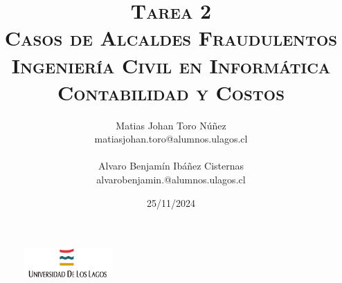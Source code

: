 \documentclass[letter,12pt]{article}
\begin{document}
	\begin{figure}
		\includegraphics[width=0.3\textwidth, left]{figures/download.png}
	\end{figure}
	\setlength{\unitlength}{1 cm} 
	\title{\scshape\Huge{Tarea 2}\\\vspace{0.5cm}
		\Large \textbf{Casos de Alcaldes Fraudulentos}\\\vspace{2cm}
		\Large Ingeniería Civil en Informática\\\vspace{1cm}
		\Large Contabilidad y Costos\\\vspace{2cm}}
	
	\author{
		Matias Johan Toro Núñez\\
		matiasjohan.toro@alumnos.ulagos.cl \\\\
		Alvaro Benjamín Ibáñez Cisternas\\
		alvarobenjamin.@alumnos.ulagos.cl
	\vspace{3cm}}
	
	\date{25/11/2024}
	\maketitle
	\thispagestyle{empty}
	\clearpage
	\setcounter{page}{1}
	
	\tableofcontents
	\newpage
	
	
\end{document}
